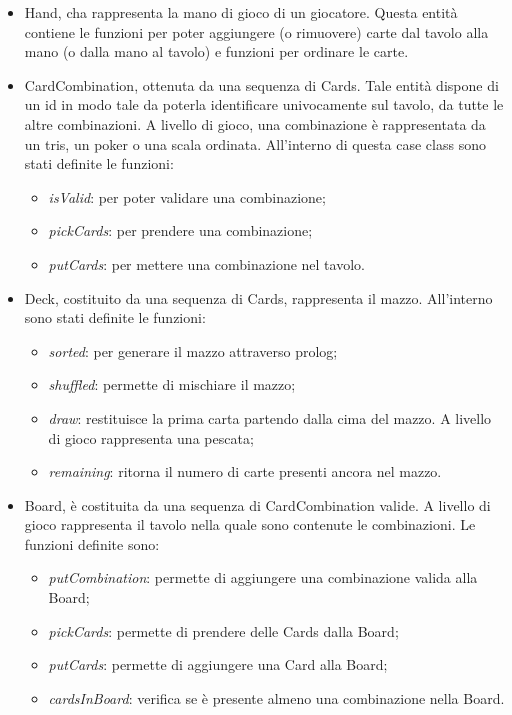 \begin{itemize}
    \item Hand, cha rappresenta la mano di gioco di un giocatore. Questa entità contiene le funzioni per poter aggiungere (o rimuovere) carte dal tavolo alla mano (o dalla mano al tavolo) e funzioni per ordinare le carte.
    \item CardCombination, ottenuta da una sequenza di Cards. Tale entità dispone di un id in modo tale da poterla identificare univocamente sul tavolo, da tutte le altre combinazioni. A livello di gioco, una combinazione è rappresentata da un tris, un poker o una scala ordinata. All’interno di questa case class sono stati definite le funzioni:
    \begin{itemize}
        \item \textit{isValid}: per poter validare una combinazione;
        \item \textit{pickCards}: per prendere una combinazione;
        \item \textit{putCards}: per mettere una combinazione nel tavolo.
    \end{itemize}
    \item Deck, costituito da una sequenza di Cards, rappresenta il mazzo. All’interno sono stati definite le funzioni:
    \begin{itemize}
        \item \textit{sorted}: per generare il mazzo attraverso prolog;
        \item \textit{shuffled}: permette di mischiare il mazzo;
        \item \textit{draw}: restituisce la prima carta partendo dalla cima del mazzo. A livello di gioco rappresenta una pescata;
        \item \textit{remaining}: ritorna il numero di carte presenti ancora nel mazzo.
    \end{itemize}
    \item Board, è costituita da una sequenza di CardCombination valide. A livello di gioco rappresenta il tavolo nella quale sono contenute le combinazioni. Le funzioni definite sono:
    \begin{itemize}
        \item \textit{putCombination}: permette di aggiungere una combinazione valida alla Board;
        \item \textit{pickCards}: permette di prendere delle Cards dalla Board;
        \item \textit{putCards}: permette di aggiungere una Card alla Board;
        \item \textit{cardsInBoard}: verifica se è presente almeno una combinazione nella Board.
    \end{itemize}
\end{itemize}

